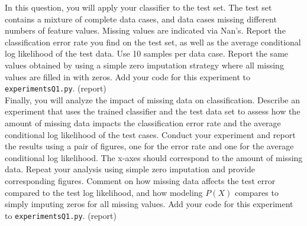 \documentclass[11pt]{article}
\begin{document}
\begin{problem}{50}
 In this question, you will apply your classifier to the test set. The test set contains
a mixture of complete data cases, and data cases missing different numbers of feature values. Missing values 
are indicated via Nan's. Report the classification error rate you find on the test set, as well as
the average conditional log likelihood of the test data. Use 10 samples per data case. Report the same 
values obtained by using a simple zero imputation strategy where all missing values are filled in 
with zeros.  Add your code for this experiment to \verb|experimentsQ1.py|. (report)\\

 Finally, you will analyze the impact of missing data on classification. Describe an
experiment that uses the trained classifier and the test data set to assess how the amount of 
missing data impacts the classification error rate and the average conditional log likelihood 
of the test cases. Conduct your experiment and report the results using a pair of figures,
one for the  error rate and one for the average conditional log likelihood. The x-axes
should correspond to the amount of missing  data.  Repeat your analysis using simple zero imputation and provide 
corresponding figures. Comment on how missing data affects the test error compared to the 
test log likelihood, and how modeling $P(X)$ compares to simply imputing zeros for all missing values. 
Add your code for this experiment to \verb|experimentsQ1.py|. (report)\\

\end{problem}
	
\end{document}
